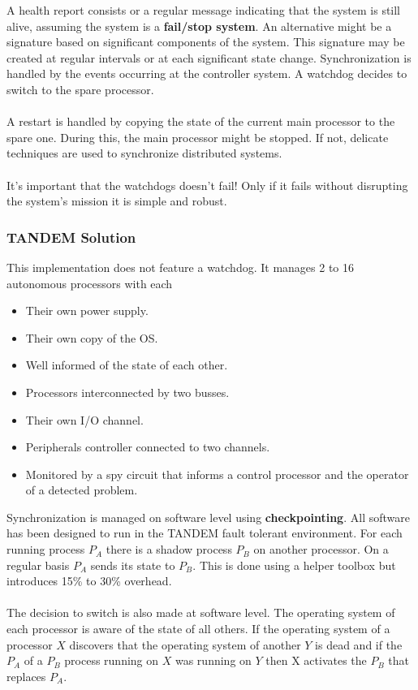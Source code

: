 \documentclass[../main.tex]{subfiles}
\begin{document}
A health report consists or a regular message indicating that the system is still alive, assuming the system is a \textbf{fail/stop system}.
An alternative might be a signature based on significant components of the system.
This signature may be created at regular intervals or at each significant state change.
Synchronization is handled by the events occurring at the controller system. A watchdog decides to switch to the spare processor. 
\\\\
A restart is handled by copying the state of the current main processor to the spare one. During this, the main processor might be stopped. If not, delicate techniques are used to synchronize distributed systems.
\\\\
It's important that the watchdogs doesn't fail! Only if it fails without disrupting the system's mission it is simple and robust.


\subsubsection{TANDEM Solution}
This implementation does not feature a watchdog. It manages 2 to 16 autonomous processors with each 
\begin{multicols}{2}
\begin{itemize}
	\item Their own power supply.
	\item Their own copy of the OS.
	\item Well informed of the state of each other.
	\item Processors interconnected by two busses.
	\item Their own I/O channel.
	\item Peripherals controller connected to two channels.
	\item Monitored by a spy circuit that informs a control processor and the operator of a detected problem.
\end{itemize}
\end{multicols}

Synchronization is managed on software level using \textbf{checkpointing}. All software has been designed to run in the TANDEM fault tolerant environment. For each running process $P_A$ there is a shadow process $P_B$ on another processor. On a regular basis $P_A$ sends its state to $P_B$. This is done using a helper toolbox but introduces 15\% to 30\% overhead.
\\\\
The decision to switch is also made at software level. The operating system of each processor is aware of the state of all others. If the operating system of a processor $X$ discovers that the operating system of another $Y$ is dead and if the $P_A$ of a $P_B$ process running on $X$ was running on $Y$ then X activates the $P_B$ that replaces $P_A$. 
\end{document}
